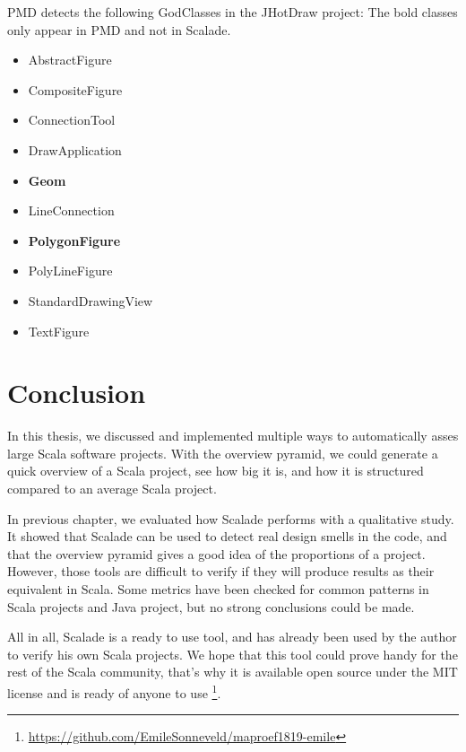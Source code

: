 \documentclass[onecolumn]{article}
\let\oldsection\section
\renewcommand\section{\clearpage\oldsection}
\begin{document}
PMD detects the following GodClasses in the JHotDraw project: The bold classes only appear in PMD and not in Scalade.
\begin{itemize}
    \item AbstractFigure
    \item CompositeFigure
    \item ConnectionTool
    \item DrawApplication
    \item \textbf{Geom}
    \item LineConnection
    \item \textbf{PolygonFigure}
    \item PolyLineFigure
    \item StandardDrawingView
    \item TextFigure
\end{itemize}


\section{Conclusion}

In this thesis, we discussed and implemented multiple ways to automatically asses large Scala software projects. With the overview pyramid, we could generate a quick overview of a Scala project, see how big it is, and how it is structured compared to an average Scala project.

In previous chapter, we evaluated how Scalade performs with a qualitative study. It showed that Scalade can be used to detect real design smells in the code, and that the overview pyramid gives a good idea of the proportions of a project. However, those tools are difficult to verify if they will produce results as their equivalent in Scala. Some metrics have been checked for common patterns in Scala projects and Java project, but no strong conclusions could be made.

All in all, Scalade is a ready to use tool, and has already been used by the author to verify his own Scala projects. We hope that this tool could prove handy for the rest of the Scala community, that's why it is available open source under the MIT license and is ready of anyone to use \footnote{\url{https://github.com/EmileSonneveld/maproef1819-emile}}. 
\end{document}
